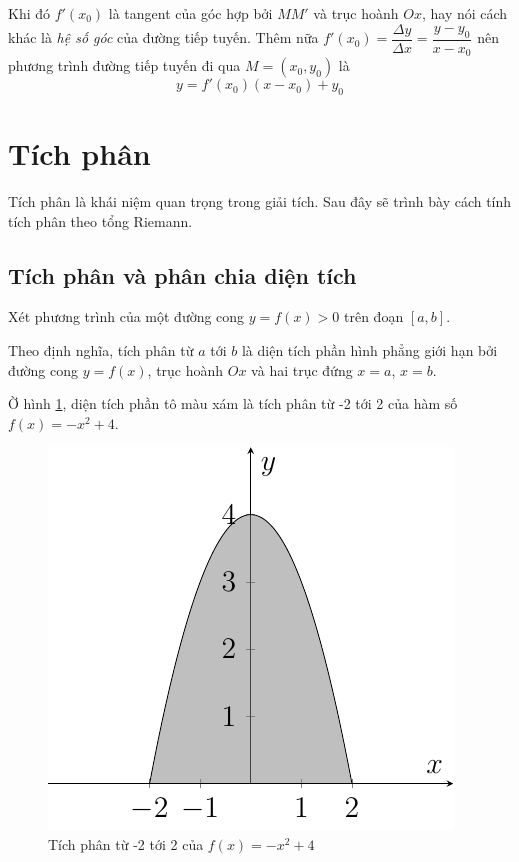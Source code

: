 Khi đó $f'(x_0)$ là tangent của góc hợp bởi $MM'$ và trục hoành $Ox$, hay nói cách khác là \textit{hệ số góc} của đường tiếp tuyến. Thêm nữa $f'(x_0) = \dfrac{\Delta y}{\Delta x} = \dfrac{y - y_0}{x - x_0}$ nên phương trình đường tiếp tuyến đi qua $M = (x_0, y_0)$ là
\begin{equation}
	y = f'(x_0) (x - x_0) + y_0
\end{equation}

\section{Tích phân}

Tích phân là khái niệm quan trọng trong giải tích. Sau đây sẽ trình bày cách tính tích phân theo tổng Riemann.

\subsection*{Tích phân và phân chia diện tích}

Xét phương trình của một đường cong $y = f(x) > 0$ trên đoạn $[a, b]$.

Theo định nghĩa, tích phân từ $a$ tới $b$ là diện tích phần hình phẳng giới hạn bởi đường cong $y = f(x)$, trục hoành $Ox$ và hai trục đứng $x = a$, $x = b$.

Ờ hình \ref{int1}, diện tích phần tô màu xám là tích phân từ -2 tới 2 của hàm số $f(x) = -x^2 + 4$.

\begin{figure}[ht]
	\centering
	\includegraphics[page=1]{analytic_geometry/int1.pdf}
	\caption{Tích phân từ -2 tới 2 của $f(x) = -x^2 + 4$}
	\label{int1}
\end{figure}

